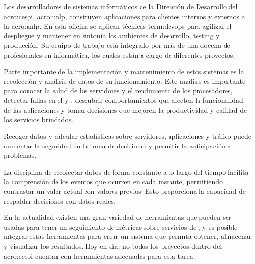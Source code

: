 Los desarrolladores de sistemas informáticos de la Dirección de Desarrollo del
\gls{acro:cespi}, \gls{acro:unlp}, construyen aplicaciones para clientes
internos y externos a la \gls{acro:unlp}. En esta oficina se aplican técnicas
\gls{term:devops} para agilizar el despliegue y mantener en sintonía los
ambientes de desarrollo, testing y producción. Su equipo de trabajo está
integrado por más de una docena de profesionales en informática, los cuales
están a cargo de diferentes proyectos.

Parte importante de la implementación y mantenimiento de estos sistemas es la
recolección y análisis de datos de su funcionamiento. Este análisis es
importante para conocer la salud de los servidores y el rendimiento de los
procesadores, detectar fallas en el  y , descubrir
comportamientos que afecten la funcionalidad de las aplicaciones y tomar
decisiones que mejoren la productividad y calidad de los servicios brindados.

Recoger datos y calcular estadísticas sobre servidores, aplicaciones y tráfico
puede aumentar la seguridad en la toma de decisiones y permitir la anticipación
a problemas.

La disciplina de recolectar datos de forma constante a lo largo del tiempo
facilita la comprensión de los eventos que ocurren en cada instante,
permitiendo contrastar un valor actual con valores previos. Esto proporciona la
capacidad de respaldar decisiones con datos reales.

En la actualidad existen una gran variedad de herramientas que pueden ser
usadas para tener un seguimiento de métricas sobre servicios de ,
y es posible integrar estas herramientas para crear un sistema que permita
obtener, almacenar y visualizar los resultados. Hoy en día, no todos los
proyectos dentro del \gls{acro:cespi} cuentan con herramientas adecuadas para
esta tarea.
